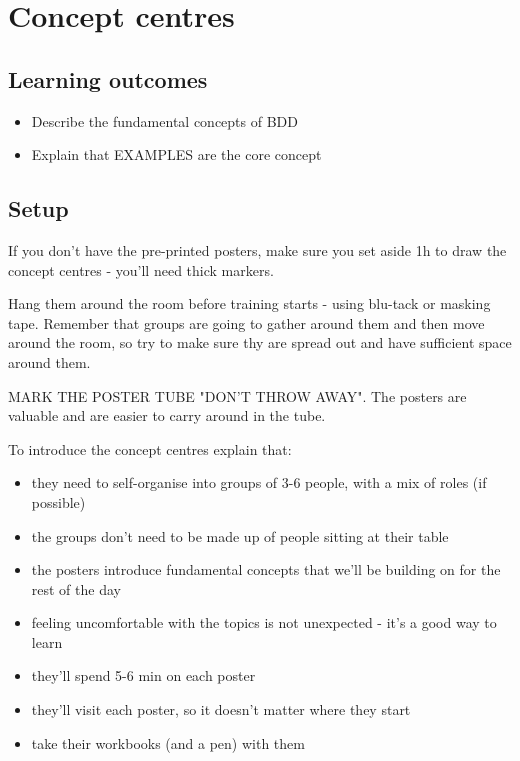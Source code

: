 \ifnotes

\chapter*{Concept centres}

    \section*{Learning outcomes}
    
    \begin{itemize}
        \item Describe the fundamental concepts of BDD
        \item Explain that EXAMPLES are the core concept
    \end{itemize}

    \section*{Setup}
    
    If you don't have the pre-printed posters, make sure you set aside 1h to draw the concept centres - you'll need thick markers. 
    
    Hang them around the room before training starts - using blu-tack or masking tape. Remember that groups are going to gather around them and then move around the room, so try to make sure thy are spread out and have sufficient space around them.
    
    MARK THE POSTER TUBE "DON'T THROW AWAY". The posters are valuable and are easier to carry around in the tube.
    
    To introduce the concept centres explain that:
    
    \begin{itemize}
        \item they need to self-organise into groups of 3-6 people, with a mix of roles (if possible)
        \item the groups don't need to be made up of people sitting at their table
        \item the posters introduce fundamental concepts that we'll be building on for the rest of the day
        \item feeling uncomfortable with the topics is not unexpected - it's a good way to learn
        \item they'll spend 5-6 min on each poster
        \item they'll visit each poster, so it doesn't matter where they start
        \item take their workbooks (and a pen) with them
    \end{itemize}
    
